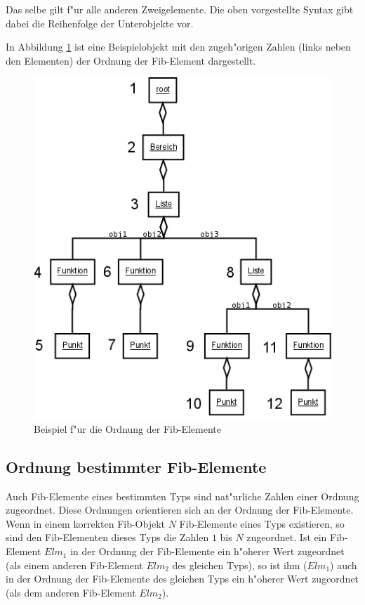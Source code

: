 Das selbe gilt f"ur alle anderen Zweigelemente. Die oben vorgestellte Syntax gibt dabei die Reihenfolge der Unterobjekte vor.

In Abbildung \ref{figOrderFibElements} ist eine Beispielobjekt mit den zugeh"origen Zahlen (links neben den Elementen) der Ordnung der Fib-Element dargestellt.

\begin{figure}[htbp]
\begin{center}
  \includegraphics[scale=0.5]{order_elements}
\end{center}
\caption{Beispiel f"ur die Ordnung der Fib-Elemente}
\label{figOrderFibElements}
\end{figure}


\subsection{Ordnung bestimmter Fib-Elemente}

Auch Fib-Elemente eines bestimmten Typs sind nat"urliche Zahlen einer Ordnung zugeordnet. Diese Ordnungen orientieren sich an der Ordnung der Fib-Elemente. Wenn in einem korrekten Fib-Objekt $N$ Fib-Elemente eines Typs existieren, so sind den Fib-Elementen dieses Typs die Zahlen $1$ bis $N$ zugeordnet. Ist ein Fib-Element $Elm_1$ in der Ordnung der Fib-Elemente ein h"oherer Wert zugeordnet (als einem anderen Fib-Element $Elm_2$ des gleichen Typs), so ist ihm ($Elm_1$) auch in der Ordnung der Fib-Elemente des gleichen Typs ein h"oherer Wert zugeordnet (als dem anderen Fib-Element $Elm_2$).


